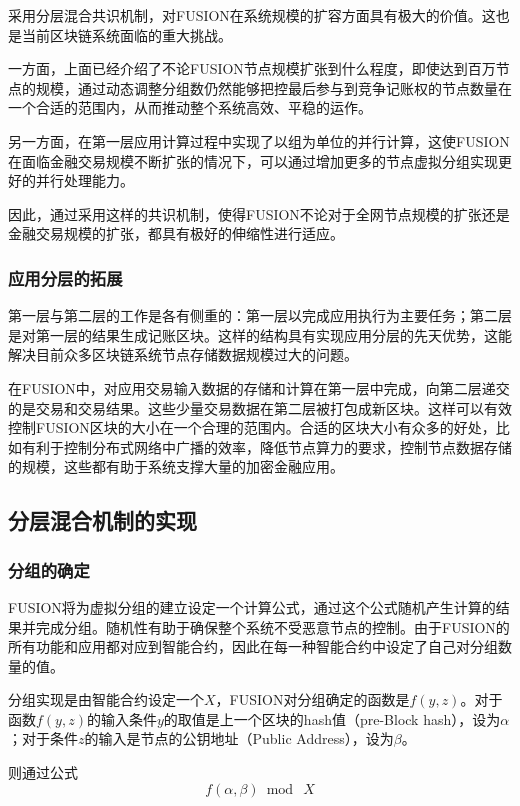 \documentclass[a4paper,12pt]{article}
\begin{document}
采用分层混合共识机制，对FUSION在系统规模的扩容方面具有极大的价值。这也是当前区块链系统面临的重大挑战。

一方面，上面已经介绍了不论FUSION节点规模扩张到什么程度，即使达到百万节点的规模，通过动态调整分组数仍然能够把控最后参与到竞争记账权的节点数量在一个合适的范围内，从而推动整个系统高效、平稳的运作。

另一方面，在第一层应用计算过程中实现了以组为单位的并行计算，这使FUSION在面临金融交易规模不断扩张的情况下，可以通过增加更多的节点虚拟分组实现更好的并行处理能力。

因此，通过采用这样的共识机制，使得FUSION不论对于全网节点规模的扩张还是金融交易规模的扩张，都具有极好的伸缩性进行适应。

\subsubsection{应用分层的拓展}

第一层与第二层的工作是各有侧重的：第一层以完成应用执行为主要任务；第二层是对第一层的结果生成记账区块。这样的结构具有实现应用分层的先天优势，这能解决目前众多区块链系统节点存储数据规模过大的问题。

在FUSION中，对应用交易输入数据的存储和计算在第一层中完成，向第二层递交的是交易和交易结果。这些少量交易数据在第二层被打包成新区块。这样可以有效控制FUSION区块的大小在一个合理的范围内。合适的区块大小有众多的好处，比如有利于控制分布式网络中广播的效率，降低节点算力的要求，控制节点数据存储的规模，这些都有助于系统支撑大量的加密金融应用。

\subsection{分层混合机制的实现}

\subsubsection{分组的确定}

FUSION将为虚拟分组的建立设定一个计算公式，通过这个公式随机产生计算的结果并完成分组。随机性有助于确保整个系统不受恶意节点的控制。由于FUSION的所有功能和应用都对应到智能合约，因此在每一种智能合约中设定了自己对分组数量的值。

分组实现是由智能合约设定一个$X$，FUSION对分组确定的函数是$f(y,z)$。对于函数$f(y,z)$的输入条件$y$的取值是上一个区块的hash值（pre-Block hash），设为$\alpha $；对于条件$z$的输入是节点的公钥地址（Public Address），设为$\beta $。

则通过公式$$f(\alpha,\beta)\bmod \ X$$
\end{document}
